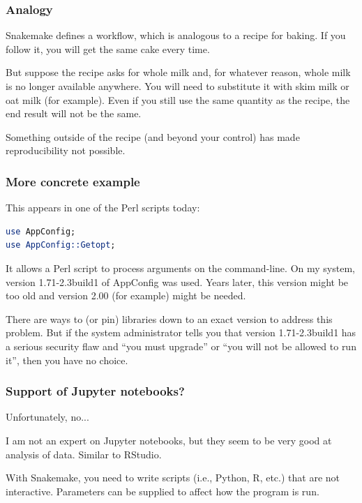 \begin{frame}

\frametitle{Analogy}

Snakemake defines a workflow, which is analogous to a recipe for baking.  If you follow it, you will get the same cake every time.
\vs

But suppose the recipe asks for whole milk and, for whatever reason, whole milk is no longer available anywhere.  You will need to substitute it with skim milk or oat milk (for example).  Even if you still use the same quantity as the recipe, the end result will not be the same.
\vs

Something outside of the recipe (and beyond your control) has made reproducibility not possible.

\end{frame}


\begin{frame}[fragile]

\frametitle{More concrete example}

This appears in one of the Perl scripts today:

\begin{tiny}
\begin{lstlisting}[frame=single,language=perl]
use AppConfig;
use AppConfig::Getopt;
\end{lstlisting}
\end{tiny}

It allows a Perl script to process arguments on the command-line.  On my system, version 1.71-2.3build1 of AppConfig was used.  Years later, this version might be too old and version 2.00 (for example) might be needed.
\vs

There are ways to {} (or pin) libraries down to an exact version to address this problem.  But if the system administrator tells you that version 1.71-2.3build1 has a serious security flaw and ``you must upgrade'' or ``you will not be allowed to run it'', then you have no choice. 

\end{frame}


\begin{frame}

\frametitle{Support of Jupyter notebooks?}

{\red{$\rightarrow$}} Unfortunately, no...
\vs

I am not an expert on Jupyter notebooks, but they seem to be very good at {} analysis of data.  Similar to RStudio.
\vs

With Snakemake, you need to write scripts (i.e., Python, R, etc.) that are not interactive.  Parameters can be supplied to affect how the program is run.

\end{frame}


